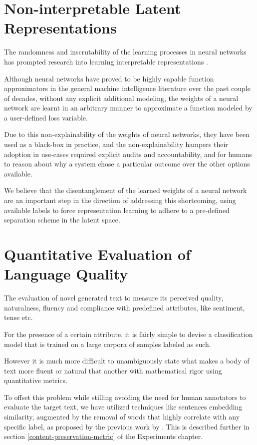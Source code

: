 \section{Non-interpretable Latent Representations}

The randomness and inscrutability of the learning processes in neural networks has prompted research into learning interpretable representations \citep{chen2016infogan}.

Although neural networks have proved to be highly capable function approximators in the general machine intelligence literature over the past couple of decades, without any explicit additional modeling, the weights of a neural network are learnt in an arbitrary manner to approximate a function modeled by a user-defined loss variable.

Due to this non-explainability of the weights of neural networks, they have been used as a black-box in practice, and the non-explainability hampers their adoption in use-cases required explicit audits and accountability, and for humans to reason about why a system chose a particular outcome over the other options available.

We believe that the disentanglement of the learned weights of a neural network are an important step in the direction of addressing this shortcoming, using available labels to force representation learning to adhere to a pre-defined separation scheme in the latent space.


\section{Quantitative Evaluation of Language Quality}

The evaluation of novel generated text to measure its perceived quality, naturalness, fluency and compliance with predefined attributes, like sentiment, tense etc.

For the presence of a certain attribute, it is fairly simple to devise a classification model that is trained on a large corpora of samples labeled as such.

However it is much more difficult to unambiguously state what makes a body of text more fluent or natural that another with mathematical rigor using quantitative metrics.

To offset this problem while stilling avoiding the need for human annotators to evaluate the target text, we have utilized techniques like sentences embedding similarity, augmented by the removal of words that highly correlate with any specific label, as proposed by the previous work by \cite{fu2017style}. This is described further in section \ref{content-preservation-metric} of the Experiments chapter.
